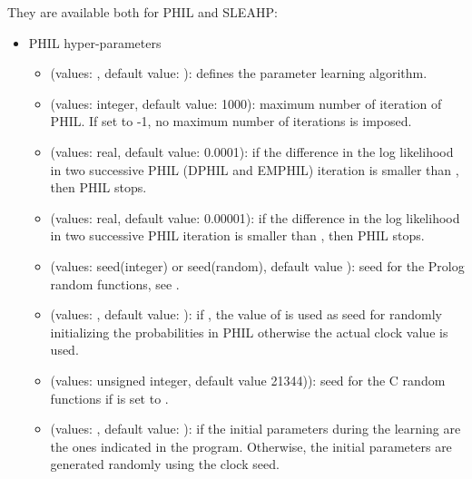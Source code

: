 \documentclass[letterpaper,10pt,english]{sphinxmanual}
\begin{document}
They are available both for PHIL and SLEAHP:
\begin{itemize}
\item {} 
PHIL hyper-parameters
\begin{itemize}
\item {} 
 (values: , default value: ): defines the parameter learning algorithm.

\item {} 
 (values: integer, default value: 1000): maximum number of iteration of PHIL. If set to -1, no maximum number of iterations is imposed.

\item {} 
 (values: real, default value: 0.0001): if the difference in the log likelihood in two successive PHIL (DPHIL and EMPHIL) iteration is smaller than , then PHIL stops.

\item {} 
 (values: real, default value: 0.00001): if the difference in the log likelihood in two successive PHIL iteration is smaller than , then PHIL stops.

\item {} 
 (values: seed(integer) or seed(random), default value ): seed for the Prolog random functions, see  .

\item {} 
 (values: , default value: ): if , the value of  is used as seed for randomly initializing the probabilities in PHIL  otherwise the actual clock value is used.

\item {} 
 (values: unsigned integer, default value 21344)): seed for the C random functions if  is set to .

\item {} 
 (values: , default value: ): if  the initial parameters during the learning are the ones indicated in the program. Otherwise, the initial parameters are generated randomly using the clock seed.


\end{itemize}
\end{itemize}
\end{document}
